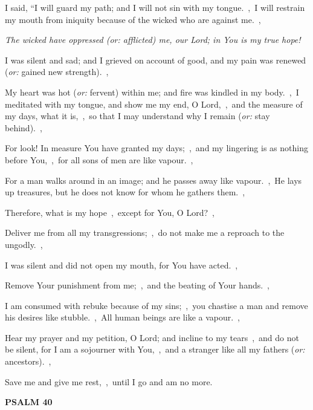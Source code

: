 \documentclass[12pt,twoside,a5paper]{article}
\newcommand{\psalm}[1]{\textbf{PSALM {#1}}\nopagebreak}
\newcommand{\qanona}[1]{{\liturgicalhint{Qanona.} \emph{#1}}}
\newcommand{\translationoption}[1]{\emph{or:} #1}
\begin{document}
\begin{normalparskip}
  I said, ``I will guard my path; and I will not sin with my tongue.~\sep\ I will restrain my mouth from iniquity because of the wicked who are against me.~\sep

  \qanona{The wicked have oppressed (\translationoption{afflicted}) me, our Lord; in You is my true hope!}

  I was silent and sad; and I grieved on account of good, and my pain was renewed (\translationoption{gained new strength}).~\sep

  My heart was hot (\translationoption{fervent}) within me; and fire was kindled in my body.~\sep\ I meditated with my tongue, and show me my end, O Lord,~\sep\ and the measure of my days, what it is,~\sep\ so that I may understand why I remain (\translationoption{stay behind}).~\sep

  For look! In measure You have granted my days;~\sep\ and my lingering is as nothing before You,~\sep\ for all sons of men are like vapour.~\sep

  For a man walks around in an image; and he passes away like vapour.~\sep\ He lays up treasures, but he does not know for whom he gathers them.~\sep

  Therefore, what is my hope~\sep\ except for You, O Lord?~\sep

  Deliver me from all my transgressions;~\sep\ do not make me a reproach to the ungodly.~\sep

  I was silent and did not open my mouth, for You have acted.~\sep

  Remove Your punishment from me;~\sep\ and the beating of Your hands.~\sep

  I am consumed with rebuke because of my sins;~\sep\ you chastise a man and remove his desires like stubble.~\sep\ All human beings are like a vapour.~\sep

  Hear my prayer and my petition, O Lord; and incline to my tears~\sep\ and do not be silent, for I am a sojourner with You,~\sep\ and a stranger like all my fathers (\translationoption{ancestors}).~\sep

  Save me and give me rest,~\sep\ until I go and am no more.
\end{normalparskip}

\psalm{40}
\end{document}
